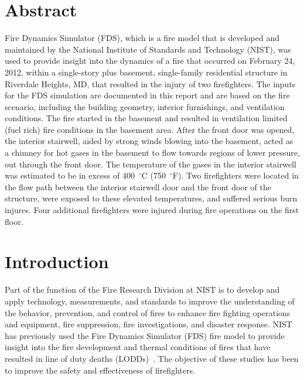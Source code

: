 \documentclass[12pt,oneside]{book}
\begin{document}
\chapter*{\centering Abstract}
Fire Dynamics Simulator (FDS), which is a fire model that is developed and maintained by the National Institute of Standards and Technology (NIST), was used to provide insight into the dynamics of a fire that occurred on February 24, 2012, within a single-story plus basement, single-family residential structure in Riverdale Heights, MD, that resulted in the injury of two firefighters. The inputs for the FDS simulation are documented in this report and are based on the fire scenario, including the building geometry, interior furnishings, and ventilation conditions. The fire started in the basement and resulted in ventilation limited (fuel rich) fire conditions in the basement area. After the front door was opened, the interior stairwell, aided by strong winds blowing into the basement, acted as a chimney for hot gases in the basement to flow towards regions of lower pressure, out through the front door. The temperature of the gases in the interior stairwell was estimated to be in excess of 400~$^{\circ}$C (750~$^{\circ}$F). Two firefighters were located in the flow path between the interior stairwell door and the front door of the structure, were exposed to these elevated temperatures, and suffered serious burn injures. Four additional firefighters were injured during fire operations on the first floor.

\chapter{Introduction}
\setcounter{page}{1}
Part of the function of the Fire Research Division at NIST is to develop and apply technology, measurements, and standards to improve the understanding of the behavior, prevention, and control of fires to enhance fire fighting operations and equipment, fire suppression, fire investigations, and disaster response. NIST has previously used the Fire Dynamics Simulator (FDS) fire model to provide insight into the fire development and thermal conditions of fires that have resulted in line of duty deaths (LODDs)~\cite{Madrzykowski:1,Iowa,Texas,Bryner:Charleston,barowy:texas,Weinschenk:Chicago}. The objective of these studies has been to improve the safety and effectiveness of firefighters.
\end{document}
